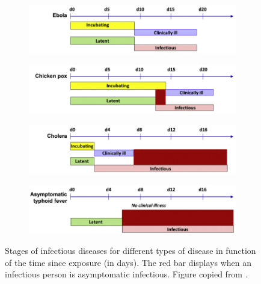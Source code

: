 \begin{figure}[!ht]
\centering
\begin{subfigure}[!ht]{\textwidth}
    \centering
    \includegraphics[width=.7\linewidth]{2 - Modelling of infectious diseases/fig/stages_ebola.png}
    \caption{}
    \label{subfig:stages_ebola} 
\end{subfigure}

\begin{subfigure}[!ht]{\textwidth}
    \centering
    \includegraphics[width=.7\linewidth]{2 - Modelling of infectious diseases/fig/stages_chicken_pox.png}
    \caption{}
    \label{subfig:stages_chicken_pox}
\end{subfigure}

\begin{subfigure}[!ht]{\textwidth}
    \centering
    \includegraphics[width=.7\linewidth]{2 - Modelling of infectious diseases/fig/stages_cholera.png}
    \caption{}
    \label{subfig:stages_cholera}
\end{subfigure}

\begin{subfigure}[!ht]{\textwidth}
    \centering
    \includegraphics[width=.7\linewidth]{2 - Modelling of infectious diseases/fig/stages_asymptomatic_typhoid_fever.png}
    \caption{}
    \label{subfig:stages_asymptomatic_typhoid_fever}
\end{subfigure}

\caption[Stages of infectious diseases]{Stages of infectious diseases for different types of disease in function of the time since exposure (in days). The red bar displays when an infectious person is asymptomatic infectious. Figure copied from \cite{book:principles_infectious_diseases}.}
\label{fig:stages_infectious_diseases}
\end{figure}

